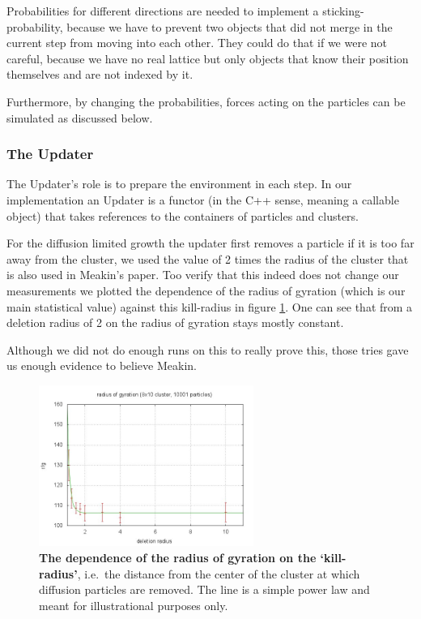 \documentclass[twocolumn, 10pt]{scrartcl}
\begin{document}
                Probabilities for different directions are needed to implement a sticking-probability, because we
                have to prevent two objects that did not merge in the current step from moving into each other. They
                could do that if we were not careful, because we have no real lattice but only objects that know their
                position themselves and are not indexed by it.
                
                Furthermore, by changing the probabilities, forces acting on the particles can be simulated as discussed
                below.

            \subsubsection{The Updater}
                The Updater's role is to prepare the environment in each step. In our implementation an Updater is a
                functor (in the C++ sense, meaning a callable object) that takes references to the containers of
                particles and clusters.

                For the diffusion limited growth the updater first removes a particle if it is too far away from the
                cluster, we used the value of 2 times the radius of the cluster that is also used in Meakin's paper. Too
                verify that this indeed does not change our measurements we plotted the dependence of the radius of
                gyration (which is our main statistical value) against this kill-radius in figure \ref{fig-killradius}.
                One can see that from a deletion radius of 2 on the radius of gyration stays mostly constant.
                
                Although we did not do enough runs on this to really prove this, those tries gave us enough evidence to
                believe Meakin.
                \begin{figure}
                    \center
                    \includegraphics[width=7cm]{img/killradius.jpg}
                    \caption[The dependence of the radius of gyration on the `kill-radius']
                        {\small\textbf{The dependence of the radius of gyration on the `kill-radius'}, i.e.\ the distance
                        from the center of the cluster at which diffusion particles are removed. The line is a simple power
                        law and meant for illustrational purposes only.}
                    \label{fig-killradius}
                \end{figure}
\end{document}
